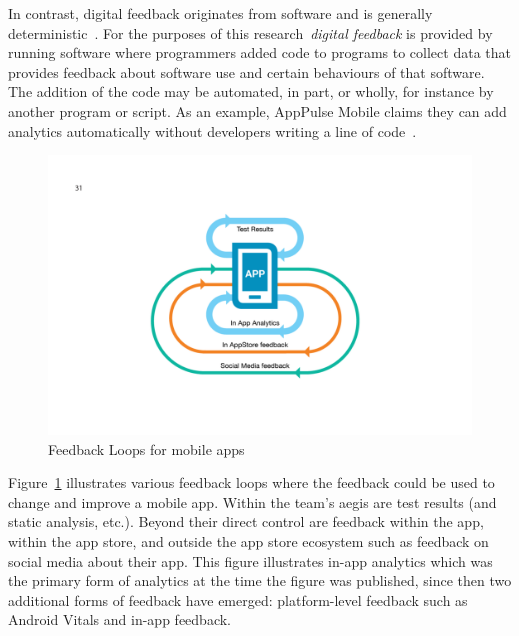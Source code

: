 In contrast, digital feedback originates from software and is generally deterministic~. For the purposes of this research~\emph{digital feedback} is provided by running software where programmers added code to programs to collect data that provides feedback about software use and certain behaviours of that software. The addition of the code may be automated, in part, or wholly, for instance by another program or script. As an example, AppPulse Mobile claims they can add analytics automatically without developers writing a line of code~.

\begin{figure}
    \includegraphics[width=\linewidth]{images/mobile-analytics-playbook/Chart-07-FeedbackLoops.pdf}
    \caption{Feedback Loops for mobile apps~\cite{harty_aymer_playbook_2016}}
    \label{fig:map2015-feedback-loops-for-mobile-apps}
\end{figure}

Figure~\ref{fig:map2015-feedback-loops-for-mobile-apps} illustrates various feedback loops where the feedback could be used to change and improve a mobile app. Within the team's aegis are test results (and static analysis, etc.). Beyond their direct control are feedback within the app, within the app store, and outside the app store ecosystem such as feedback on social media about their app. This figure illustrates in-app analytics which was the primary form of analytics at the time the figure was published, since then two additional forms of feedback have emerged: platform-level feedback such as Android Vitals and in-app feedback.

